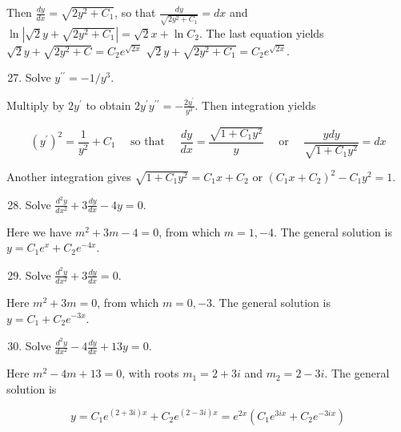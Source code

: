 \documentclass[10pt]{article}
\begin{document}
Then $\frac{d y}{d x}=\sqrt{2 y^{2}+C_{1}}$, so that $\frac{d y}{\sqrt{2 y^{2}+C_{1}}}=d x$ and $\ln \left|\sqrt{2} y+\sqrt{2 y^{2}+C_{1}}\right|=\sqrt{2} x+\ln C_{2}$. The last equation yields\\
$\sqrt{2} y+\sqrt{2 y^{2}+C}=C_{2} e^{\sqrt{2 x}}$ $\sqrt{2} y+\sqrt{2 y^{2}+C_{1}}=C_{2} e^{\sqrt{2 x}}$.

\begin{enumerate}
  \setcounter{enumi}{26}
  \item Solve $y^{\prime \prime}=-1 / y^{3}$.
\end{enumerate}

Multiply by $2 y^{\prime}$ to obtain $2 y^{\prime} y^{\prime \prime}=-\frac{2 y^{\prime}}{y^{3}}$. Then integration yields

$$
\left(y^{\prime}\right)^{2}=\frac{1}{y^{2}}+C_{1} \quad \text { so that } \quad \frac{d y}{d x}=\frac{\sqrt{1+C_{1} y^{2}}}{y} \quad \text { or } \quad \frac{y d y}{\sqrt{1+C_{1} y^{2}}}=d x
$$

Another integration gives $\sqrt{1+C_{1} y^{2}}=C_{1} x+C_{2}$ or $\left(C_{1} x+C_{2}\right)^{2}-C_{1} y^{2}=1$.

\begin{enumerate}
  \setcounter{enumi}{27}
  \item Solve $\frac{d^{2} y}{d x^{2}}+3 \frac{d y}{d x}-4 y=0$.
\end{enumerate}

Here we have $m^{2}+3 m-4=0$, from which $m=1,-4$. The general solution is $y=C_{1} e^{x}+C_{2} e^{-4 x}$.

\begin{enumerate}
  \setcounter{enumi}{28}
  \item Solve $\frac{d^{2} y}{d x^{2}}+3 \frac{d y}{d x}=0$.
\end{enumerate}

Here $m^{2}+3 m=0$, from which $m=0,-3$. The general solution is $y=C_{1}+C_{2} e^{-3 x}$.

\begin{enumerate}
  \setcounter{enumi}{29}
  \item Solve $\frac{d^{2} y}{d x^{2}}-4 \frac{d y}{d x}+13 y=0$.
\end{enumerate}

Here $m^{2}-4 m+13=0$, with roots $m_{1}=2+3 i$ and $m_{2}=2-3 i$. The general solution is

$$
y=C_{1} e^{(2+3 i) x}+C_{2} e^{(2-3 i) x}=e^{2 x}\left(C_{1} e^{3 i x}+C_{2} e^{-3 i x}\right)
$$
\end{document}
